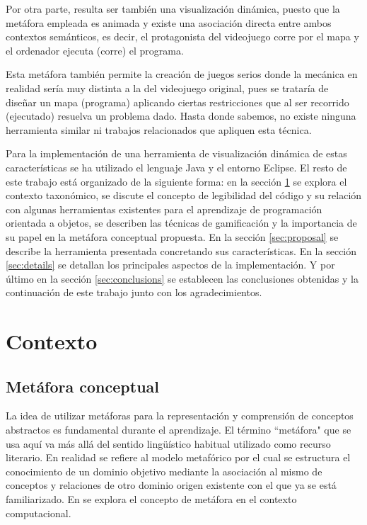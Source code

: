 \documentclass{llncs}
\begin{document}
Por otra parte, resulta ser también una visualización dinámica, puesto que la metáfora empleada es animada y existe una asociación directa entre ambos contextos semánticos, es decir, el protagonista del videojuego corre por el mapa y el ordenador ejecuta (corre) el programa. 

Esta metáfora también permite la creación de juegos serios donde la mecánica en realidad sería muy distinta a la del videojuego original, pues se trataría de diseñar un mapa (programa) aplicando ciertas restricciones que al ser recorrido (ejecutado) resuelva un problema dado. Hasta donde sabemos, no existe ninguna herramienta similar ni trabajos relacionados que apliquen esta técnica.

Para la implementación de una herramienta de visualización dinámica de estas características se ha utilizado el lenguaje Java y el entorno Eclipse. El resto de este trabajo está organizado de la siguiente forma: en la sección \ref{sec:background} se explora el contexto taxonómico, se discute el concepto de legibilidad del código y su relación con algunas herramientas existentes para el aprendizaje de programación orientada a objetos, se describen las técnicas de gamificación y la importancia de su papel en la metáfora conceptual propuesta. En la sección \ref{sec:proposal} se describe la herramienta presentada concretando sus características. En la sección \ref{sec:details} se detallan los principales aspectos de la implementación. Y por último en la sección \ref{sec:conclusions} se establecen las conclusiones obtenidas y la continuación de este trabajo junto con los agradecimientos. 

%
%
\section{Contexto}
\label{sec:background}
\subsection{Metáfora conceptual}

La idea de utilizar metáforas para la representación y comprensión de conceptos abstractos es fundamental durante el aprendizaje. El término ``metáfora" que se usa aquí va más allá del sentido lingüístico habitual utilizado como recurso literario. En realidad se refiere al modelo metafórico por el cual se estructura el conocimiento de un dominio objetivo mediante la asociación al mismo de conceptos y relaciones de otro dominio origen existente con el que ya se está familiarizado. En \cite{travers1996programming} se explora el concepto de metáfora en el contexto computacional.
\end{document}
